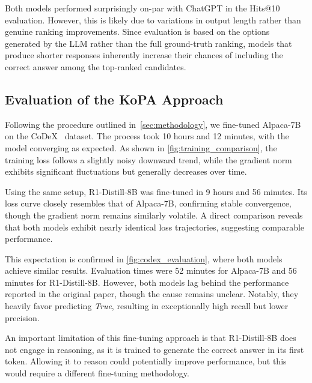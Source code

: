 \documentclass[12pt,a4paper]{article}
\newcommand{\modelalpaca}{Alpaca-7B\xspace}
\newcommand{\modeldeepseek}{R1-Distill-8B\xspace}
\begin{document}
Both models performed surprisingly on-par with ChatGPT in the Hits@10 evaluation.
However, this is likely due to variations in output length rather than genuine ranking improvements.
Since evaluation is based on the options generated by the LLM rather than the full ground-truth ranking, models that produce shorter responses inherently increase their chances of including the correct answer among the top-ranked candidates.


\subsection{Evaluation of the KoPA Approach}

Following the procedure outlined in~\cref{sec:methodology}, we fine-tuned \modelalpaca on the CoDeX~\cite{safavi2020codex} dataset.
The process took 10 hours and 12 minutes, with the model converging as expected.
As shown in \cref{fig:training_comparison}, the training loss follows a slightly noisy downward trend, while the gradient norm exhibits significant fluctuations but generally decreases over time.

Using the same setup, \modeldeepseek was fine-tuned in 9 hours and 56 minutes.
Its loss curve closely resembles that of \modelalpaca, confirming stable convergence, though the gradient norm remains similarly volatile.
A direct comparison reveals that both models exhibit nearly identical loss trajectories, suggesting comparable performance.

This expectation is confirmed in \cref{fig:codex_evaluation}, where both models achieve similar results.
Evaluation times were 52 minutes for \modelalpaca and 56 minutes for \modeldeepseek.
However, both models lag behind the performance reported in the original paper, though the cause remains unclear.
Notably, they heavily favor predicting \textit{True}, resulting in exceptionally high recall but lower precision.

An important limitation of this fine-tuning approach is that \modeldeepseek does not engage in reasoning, as it is trained to generate the correct answer in its first token.
Allowing it to reason could potentially improve performance, but this would require a different fine-tuning methodology.
\end{document}

